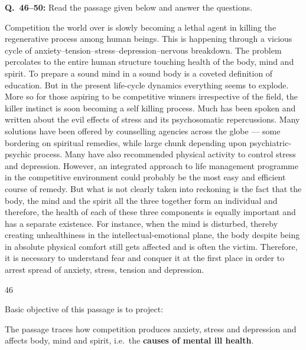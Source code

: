 \begin{context}
\textbf{Q.~46--50:} Read the passage given below and answer the questions.\par\smallskip
Competition the world over is slowly becoming a lethal agent in killing the regenerative process among human beings. This is happening through a vicious cycle of anxiety--tension--stress--depression--nervous breakdown. The problem percolates to the entire human structure touching health of the body, mind and spirit. To prepare a sound mind in a sound body is a coveted definition of education. But in the present life-cycle dynamics everything seems to explode. More so for those aspiring to be competitive winners irrespective of the field, the killer instinct is soon becoming a self killing process. Much has been spoken and written about the evil effects of stress and its psychosomatic repercussions. Many solutions have been offered by counselling agencies across the globe --- some bordering on spiritual remedies, while large chunk depending upon psychiatric-psychic process. Many have also recommended physical activity to control stress and depression. However, an integrated approach to life management programme in the competitive environment could probably be the most easy and efficient course of remedy. But what is not clearly taken into reckoning is the fact that the body, the mind and the spirit all the three together form an individual and therefore, the health of each of these three components is equally important and has a separate existence. For instance, when the mind is disturbed, thereby creating unhealthiness in the intellectual-emotional plane, the body despite being in absolute physical comfort still gets affected and is often the victim. Therefore, it is necessary to understand fear and conquer it at the first place in order to arrest spread of anxiety, stress, tension and depression.
\end{context}
\begin{question}{46}
{Basic objective of this passage is to project:\par}
\begin{explain}
The passage traces how competition produces anxiety, stress and depression and affects body, mind and spirit, i.e.\ the \textbf{causes of mental ill health}.
\end{explain}
\end{question}

